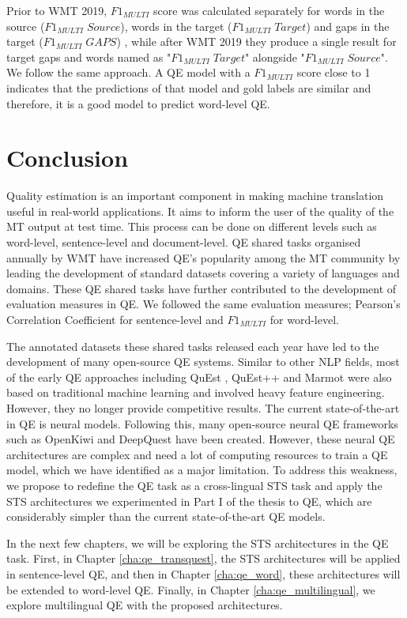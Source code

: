 Prior to WMT 2019, $F1_{\textit{MULTI}}$ score was calculated separately for words in the source ($F1_{\textit{MULTI}} \; Source$), words in the target ($F1_{\textit{MULTI}} \; Target$) and gaps in the target ($F1_{\textit{MULTI}} \; GAPS$) \autocite{specia-etal-2018-findings}, while after WMT 2019 \autocite{fonseca-etal-2019-findings,specia-etal-2020-findings-wmt} they produce a single result for target gaps and words named as "$F1_{\textit{MULTI}} \; Target$" alongside "$F1_{\textit{MULTI}} \; Source$". We follow the same approach.  A QE model with a $F1_{\textit{MULTI}}$ score close to 1 indicates that the predictions of that model and gold labels are similar and therefore, it is a good model to predict word-level QE.    

\section{Conclusion}
\label{sec:qe_conclusion}
Quality estimation is an important component in making machine translation useful in real-world applications. It aims to inform the user of the quality of the MT output at test time. This process can be done on different levels such as word-level, sentence-level and document-level. QE shared tasks organised annually by WMT have increased QE's popularity among the MT community by leading the development of standard datasets covering a variety of languages and domains. These QE shared tasks have further contributed to the development of evaluation measures in QE.  We followed the same evaluation measures; Pearson's Correlation Coefficient for sentence-level and $F1_{\textit{MULTI}}$ for word-level.

The annotated datasets these shared tasks released each year have led to the development of many open-source QE systems. Similar to other NLP fields, most of the early QE approaches including QuEst \autocite{specia-etal-2013-quest}, QuEst++ \autocite{specia-etal-2015-multi} and Marmot \autocite{logacheva-etal-2016-marmot} were also based on traditional machine learning and involved heavy feature engineering. However, they no longer provide competitive results. The current state-of-the-art in QE is neural models. Following this, many open-source neural QE frameworks such as OpenKiwi \autocite{kepler-etal-2019-openkiwi} and DeepQuest \autocite{ive-etal-2018-deepquest} have been created. However, these neural QE architectures are complex and need a lot of computing resources to train a QE model, which we have identified as a major limitation. To address this weakness, we propose to redefine the QE task as a cross-lingual STS task and apply the STS architectures we experimented in Part I of the thesis to QE, which are considerably simpler than the current state-of-the-art QE models.

In the next few chapters, we will be exploring the STS architectures in the QE task. First, in Chapter \ref{cha:qe_transquest}, the STS architectures will be applied in sentence-level QE, and then in Chapter \ref{cha:qe_word}, these architectures will be extended to word-level QE. Finally, in Chapter \ref{cha:qe_multilingual}, we explore multilingual QE with the proposed architectures.
